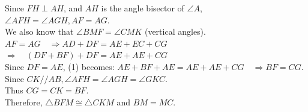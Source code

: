 \documentclass{article}
\begin{document}
Since \(F H \perp A H\), and \(A H\) is the angle bisector of \(\angle A\),\\
\(\angle A F H=\angle A G H, A F=A G\).\\
We also know that \(\angle B M F=\angle C M K\) (vertical angles).\\
\(A F=A G \quad \Rightarrow A D+D F=A E+E C+C G\)\\
\(\Rightarrow \quad(D F+B F)+D F=A E+A E+C G\)\\
Since \(D F=A E\), (1) becomes: \(A E+B F+A E=A E+A E+C G \quad \Rightarrow B F=C G\).\\
Since \(C K / / A B, \angle A F H=\angle A G H=\angle G K C\).\\
Thus \(C G=C K=B F\).\\
Therefore, \(\triangle B F M \cong \triangle C K M\) and \(B M=M C\).
\end{document}
